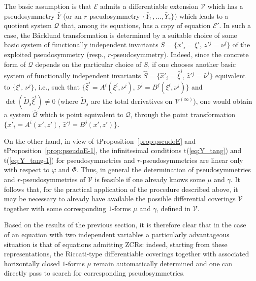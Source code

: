 \documentclass[12pt,english]{elsarticle}
\theoremstyle{plain}
\theoremstyle{plain}
\theoremstyle{remark}
\theoremstyle{plain}
\theoremstyle{definition}
\theoremstyle{definition}
\begin{document}
The basic assumption is that $\mathcal{E}$ admits a differentiable extension
$\mathcal{V}$ which has a pseudosymmetry $\bar{Y}$ (or an $r$-pseudosymmetry
$\{\bar{Y}_{1},...,\bar{Y}_{r}\}$) which leads to a quotient system
$\mathcal{Q}$ that, among its equations, has a copy of equation
$\mathcal{E }'$. In such a case, the B\"{a}cklund transformation
is determined by a suitable choice of some basic system of functionally
independent invariants $S=\{x'_{i}=\xi ^{i},\,z'{}^{j}=\nu ^{j}\}$ of the
exploited pseudosymmetry (resp., $r$-pseudosymmetry). Indeed, since the
concrete form of $\mathcal{Q}$ depends on the particular choice of
$S$, if one chooses another basic system of functionally independent invariants
$\hat{S}=\{\hat{x}'_{i}=\hat{\xi}^{i},\,\hat{z}'{}^{j}=\hat{\nu}^{j}
\}$ equivalent to $\{\xi ^{i},\,\nu ^{j}\}$, i.e., such that
$\{\hat{\xi}^{i}=A^{i}(\xi ^{i},\nu ^{j}),\,\hat{\nu}^{j}=B^{j}(\xi ^{i},
\nu ^{j})\}$ and
$\det \left (\tilde{D}_{s}\hat{\xi}^{i}\right )\neq 0$ (where
$\tilde{D}_{s}$ are the total derivatives on
$\mathcal{V}^{(\infty )}$), one would obtain a system
$\mathcal{\hat{Q}}$ which is point equivalent to $\mathcal{Q}$, through
the point transformation
$\{\hat{x}'_{i}=A^{i}(x',z'),\,\hat{z}'{}^{j}=B^{j}(x',z')\}$.

On the other hand, in view of t{Proposition~\ref{prop:pseudoE}} and t{Proposition~\ref{prop:pseudoE-1}}, the infinitesimal conditions t{(\ref{eq:Y_tang})} and
t{(\ref{eq:Y_tang-1})} for pseudosymmetries and $r$-pseudosymmetries are linear
only with respect to $\varphi $ and $\Phi $. Thus, in general the determination
of pseudosymmetries and $r$-pseudosymmetries of
$\mathcal{V }$ is feasible if one already knows some
$\mu $ and $\gamma $. It follows that, for the practical application of
the procedure described above, it may be necessary to already have available
the possible differential coverings $\mathcal{V}$ together with some corresponding
$1$-forms $\mu $ and $\gamma $, defined in $\mathcal{V}$.

Based on the results of the previous section, it is therefore clear that
in the case of an equation with two independent variables a particularly
advantageous situation is that of equations admitting ZCRs: indeed, starting
from these representations, the Riccati-type differentiable coverings together
with associated horizontally closed $1$-forms $\mu $ remain automatically
determined and one can directly pass to search for corresponding pseudosymmetries.
\end{document}
